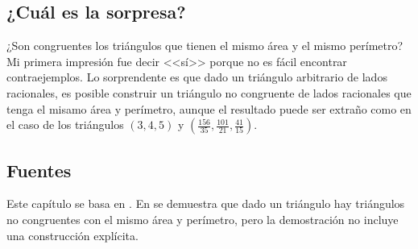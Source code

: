 \subsection*{¿Cuál es la sorpresa?}

¿Son congruentes los triángulos que tienen el mismo área y el mismo perímetro? Mi primera impresión fue decir <<sí>> porque no es fácil encontrar contraejemplos. Lo sorprendente es que dado un triángulo arbitrario de lados racionales, es posible construir un triángulo no congruente de lados racionales que tenga el misamo área y perímetro, aunque el resultado puede ser extraño como en el caso de los triángulos $(3,4,5)$ y $\left(\frac{156}{35}, \frac{101}{21}, \frac{41}{15}\right)$.

\subsection*{Fuentes}

Este capítulo se basa en \cite{mccallum}. En \cite{marita} se demuestra que dado un triángulo  hay triángulos no congruentes con el mismo área y perímetro, pero la demostración no incluye una construcción explícita.
